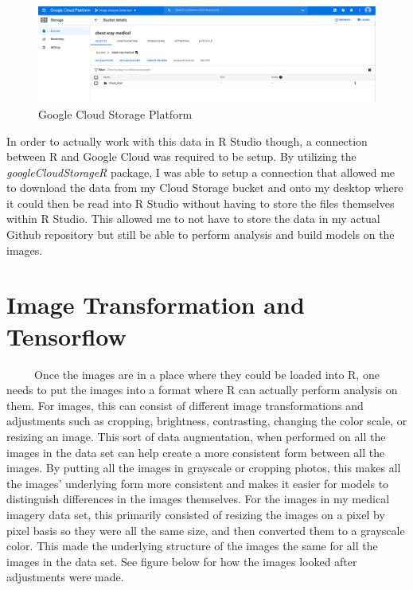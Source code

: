 \documentclass[12pt]{article}
\begin{document}
\begin{figure}

{\centering \includegraphics[width=0.75\linewidth,height=0.25\textheight]{images/cloud_storage} 

}

\caption{Google Cloud Storage Platform}\label{fig:sample-fig2}
\end{figure}

In order to actually work with this data in R Studio though, a
connection between R and Google Cloud was required to be setup. By
utilizing the \emph{googleCloudStorageR} package, I was able to setup a
connection that allowed me to download the data from my Cloud Storage
bucket and onto my desktop where it could then be read into R Studio
without having to store the files themselves within R Studio. This
allowed me to not have to store the data in my actual Github repository
but still be able to perform analysis and build models on the images.

\hypertarget{image-transformation-and-tensorflow}{%
\section{Image Transformation and
Tensorflow}\label{image-transformation-and-tensorflow}}

~~~~~Once the images are in a place where they could be loaded into R,
one needs to put the images into a format where R can actually perform
analysis on them. For images, this can consist of different image
transformations and adjustments such as cropping, brightness,
contrasting, changing the color scale, or resizing an image. This sort
of data augmentation, when performed on all the images in the data set
can help create a more consistent form between all the images. By
putting all the images in grayscale or cropping photos, this makes all
the images' underlying form more consistent and makes it easier for
models to distinguish differences in the images themselves. For the
images in my medical imagery data set, this primarily consisted of
resizing the images on a pixel by pixel basis so they were all the same
size, and then converted them to a grayscale color. This made the
underlying structure of the images the same for all the images in the
data set. See figure below for how the images looked after adjustments
were made.
\end{document}
